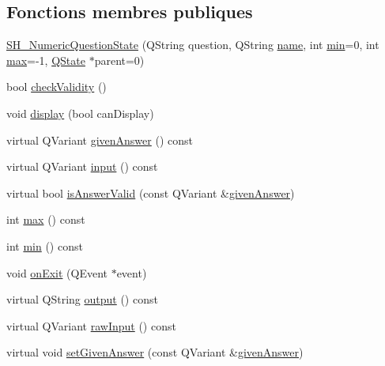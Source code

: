 \subsection*{Fonctions membres publiques}
\begin{DoxyCompactItemize}
\item 
\hyperlink{classSH__NumericQuestionState_a848096e00f892bb8c7310943980a6c61}{S\-H\-\_\-\-Numeric\-Question\-State} (Q\-String question, Q\-String \hyperlink{classSH__NamedObject_a970f265df31b28b2179bbbceb6170ac2}{name}, int \hyperlink{classSH__NumericQuestionState_a5acb66d7a0365c9850195e5b9a2d5145}{min}=0, int \hyperlink{classSH__NumericQuestionState_ac042a94900f79aba298fb013e3ec059b}{max}=-\/1, \hyperlink{classQState}{Q\-State} $\ast$parent=0)
\item 
bool \hyperlink{classSH__QuestionState_a3ca5459c20ef591023c0572d8224146c}{check\-Validity} ()
\item 
void \hyperlink{classSH__InOutState_a918e8a7f5fe00dc16004e46eeee1281d}{display} (bool can\-Display)
\item 
virtual Q\-Variant \hyperlink{classSH__QuestionState_abde97c61175be95358ece622fd16593e}{given\-Answer} () const 
\item 
virtual Q\-Variant \hyperlink{classSH__InOutState_a04364c76d2fd8a3781e7b325955e5bd9}{input} () const 
\item 
virtual bool \hyperlink{classSH__NumericQuestionState_afa783a2ebc3875bc6b8c3d823e24e30b}{is\-Answer\-Valid} (const Q\-Variant \&\hyperlink{classSH__QuestionState_abde97c61175be95358ece622fd16593e}{given\-Answer})
\item 
int \hyperlink{classSH__NumericQuestionState_ac042a94900f79aba298fb013e3ec059b}{max} () const 
\item 
int \hyperlink{classSH__NumericQuestionState_a5acb66d7a0365c9850195e5b9a2d5145}{min} () const 
\item 
void \hyperlink{classSH__InOutState_a36636cba0d68476288bce5fd4c041db0}{on\-Exit} (Q\-Event $\ast$event)
\item 
virtual Q\-String \hyperlink{classSH__InOutState_a1a2fd4f34484125058e20730aaee7e46}{output} () const 
\item 
virtual Q\-Variant \hyperlink{classSH__InOutState_a4b1ca094de91c47690ec2d1e95678273}{raw\-Input} () const 
\item 
virtual void \hyperlink{classSH__QuestionState_a9d285a34a7002fd05a7fa8ff9139c264}{set\-Given\-Answer} (const Q\-Variant \&\hyperlink{classSH__QuestionState_abde97c61175be95358ece622fd16593e}{given\-Answer})

\end{DoxyCompactItemize}
